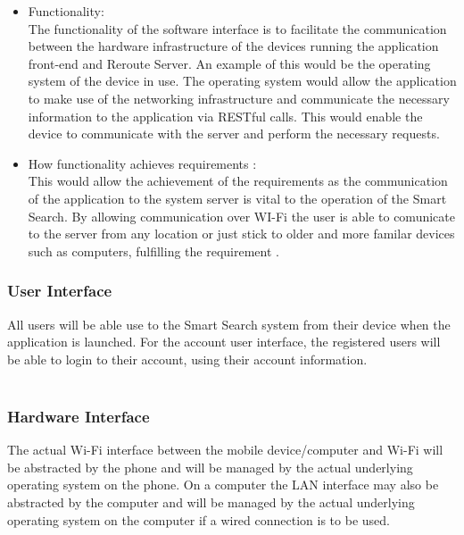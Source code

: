 \documentclass[a4paper,10pt]{article}
\begin{document}
{\begin{enumerate}
					\begin{itemize}
					\item Functionality:\\
						The functionality of the software interface is to facilitate the communication between the hardware infrastructure of the devices running the application front-end and Reroute Server. An example of this would be the operating system of the device in use. The operating system would allow the application to make use of the networking infrastructure and communicate the necessary information to the application via RESTful calls. This would enable the device to communicate with the server and perform the necessary requests.
\\
					\item How functionality achieves requirements :\\
This would allow the achievement of the requirements as the communication of the application to the system server is vital to the operation of the Smart Search. By allowing communication over WI-Fi the user is able to comunicate to the server from any location  or just stick to older and more familar devices such as computers, fulfilling the requirement .
					\end{itemize}
			\end{enumerate} 
}

		
            \subsubsection{User Interface}
	    {All users will be able use to the Smart Search system from their device when the application is launched.
For the account user interface, the registered users will be able to login to their account, using their account information.
\\\\
}

\subsubsection{Hardware Interface}
		{
The actual Wi-Fi interface between the mobile device/computer and Wi-Fi will be abstracted by the phone and will be managed by the actual underlying operating system on the phone. On a computer the LAN interface may also be abstracted by the computer and will be managed by the actual underlying operating system on the computer if a wired connection is to be used.}
\end{document}
